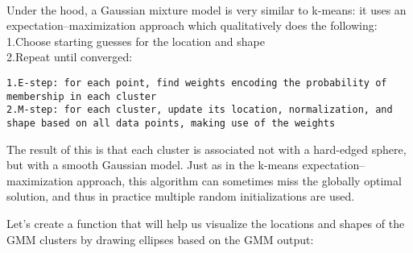 \documentclass[11pt]{article}
\begin{document}
    \begin{center}
    \end{center}
    { \hspace*{\fill} \\}
    
    Under the hood, a Gaussian mixture model is very similar to k-means: it
uses an expectation--maximization approach which qualitatively does the
following:\\
1.Choose starting guesses for the location and shape\\
2.Repeat until converged:

\begin{verbatim}
1.E-step: for each point, find weights encoding the probability of membership in each cluster
2.M-step: for each cluster, update its location, normalization, and shape based on all data points, making use of the weights
\end{verbatim}

The result of this is that each cluster is associated not with a
hard-edged sphere, but with a smooth Gaussian model. Just as in the
k-means expectation--maximization approach, this algorithm can sometimes
miss the globally optimal solution, and thus in practice multiple random
initializations are used.

Let's create a function that will help us visualize the locations and
shapes of the GMM clusters by drawing ellipses based on the GMM output:
\end{document}
